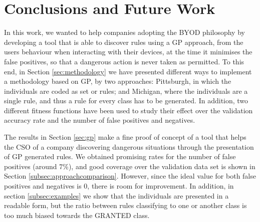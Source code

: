 \documentclass[runningheads]{llncs}
\begin{document}
\section{Conclusions and Future Work}
\label{sec:future}


In this work, we wanted to help companies adopting the BYOD philosophy
by developing a tool that is able to discover rules using a GP
approach, from the users behaviour when interacting with their
devices, at the time it minimises the false positives, so that a
dangerous action is never taken as permitted. To this end, in Section \ref{sec:methodology} we have
presented different ways to implement a methodology based on GP, by two
approaches: Pittsburgh, in which the individuals are coded as set or
rules; and Michigan, where the individuals are a single rule, and thus
a rule for every class has to be generated. In addition, two different
fitness functions have been used to study their effect over the
validation accuracy rate and the number of false positives and
negatives.

The results in Section \ref{sec:gp} make a fine proof of concept of a tool that helps the CSO of a company discovering dangerous situations through the presentation of GP generated rules. We obtained promising rates for the number of false positives (around
7\%), and good coverage over the validation data set is shown in Section \ref{subsec:approachcomparison}. However, since the ideal value for both false positives and negatives is 0, there is room for improvement. In addition, in section \ref{subsec:examples} we show that the individuals are presented in a readable form, but the ratio between rules classifying to one or another class is too much biased towards the GRANTED class. 
\end{document}
